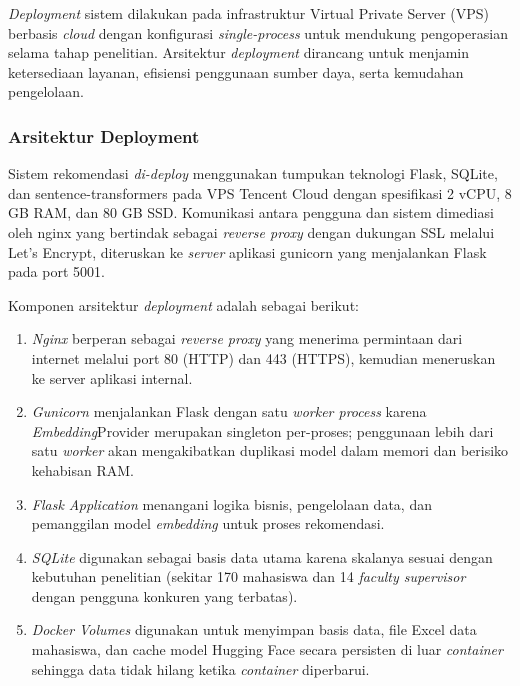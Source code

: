 \textit{Deployment} sistem dilakukan pada infrastruktur Virtual Private Server (VPS) berbasis \textit{cloud} dengan konfigurasi \textit{single-process} untuk mendukung pengoperasian selama tahap penelitian. Arsitektur \textit{deployment} dirancang untuk menjamin ketersediaan layanan, efisiensi penggunaan sumber daya, serta kemudahan pengelolaan.

\subsubsection{Arsitektur Deployment}\label{arsitektur-deployment}

Sistem rekomendasi \textit{di-deploy} menggunakan tumpukan teknologi Flask, SQLite, dan sentence-transformers pada VPS Tencent Cloud dengan spesifikasi 2 vCPU, 8 GB RAM, dan 80 GB SSD. Komunikasi antara pengguna dan sistem dimediasi oleh nginx yang bertindak sebagai \textit{reverse proxy} dengan dukungan SSL melalui Let's Encrypt, diteruskan ke \textit{server} aplikasi gunicorn yang menjalankan Flask pada port 5001.

Komponen arsitektur \textit{deployment} adalah sebagai berikut:

\begin{enumerate}
\def\labelenumi{\arabic{enumi}.}
\item
  \textit{Nginx} berperan sebagai \textit{reverse proxy} yang menerima permintaan dari internet melalui port 80 (HTTP) dan 443 (HTTPS), kemudian meneruskan ke server aplikasi internal.
\item
  \textit{Gunicorn} menjalankan Flask dengan satu \textit{worker process} karena \textit{Embedding}Provider merupakan singleton per-proses; penggunaan lebih dari satu \textit{worker} akan mengakibatkan duplikasi model dalam memori dan berisiko kehabisan RAM.
\item
  \textit{Flask Application} menangani logika bisnis, pengelolaan data, dan pemanggilan model \textit{embedding} untuk proses rekomendasi.
\item
  \textit{SQLite} digunakan sebagai basis data utama karena skalanya sesuai dengan kebutuhan penelitian (sekitar 170 mahasiswa dan 14 \textit{faculty supervisor} dengan pengguna konkuren yang terbatas).
\item
  \textit{Docker Volumes} digunakan untuk menyimpan basis data, file Excel data mahasiswa, dan cache model Hugging Face secara persisten di luar \textit{container} sehingga data tidak hilang ketika \textit{container} diperbarui.
\end{enumerate}

